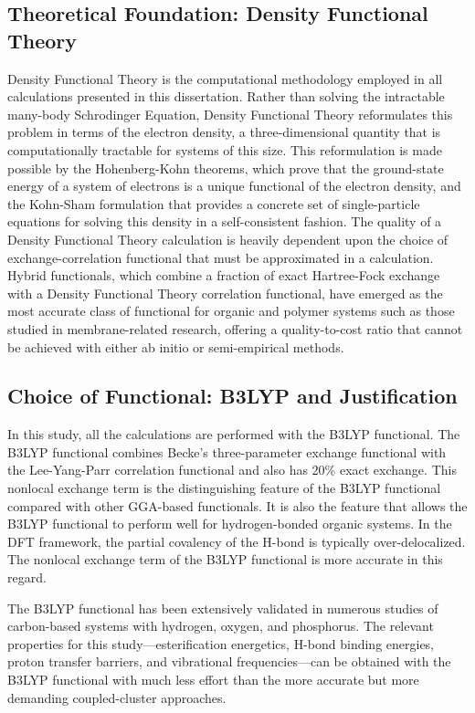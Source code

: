 \documentclass[12pt,a4paper]{report}
\begin{document}
\subsection{Theoretical Foundation: Density Functional Theory}
Density Functional Theory is the computational methodology employed in all calculations presented in this dissertation. Rather than solving the intractable many-body Schrodinger Equation, Density Functional Theory reformulates this problem in terms of the electron density, a three-dimensional quantity that is computationally tractable for systems of this size.\cite{72, 73} This reformulation is made possible by the Hohenberg-Kohn theorems, which prove that the ground-state energy of a system of electrons is a unique functional of the electron density, and the Kohn-Sham formulation that provides a concrete set of single-particle equations for solving this density in a self-consistent fashion.
The quality of a Density Functional Theory calculation is heavily dependent upon the choice of exchange-correlation functional that must be approximated in a calculation. Hybrid functionals, which combine a fraction of exact Hartree-Fock exchange with a Density Functional Theory correlation functional, have emerged as the most accurate class of functional for organic and polymer systems such as those studied in membrane-related research, offering a quality-to-cost ratio that cannot be achieved with either ab initio or semi-empirical methods.\cite{72, 73}

\subsection{Choice of Functional: B3LYP and Justification}
In this study, all the calculations are performed with the B3LYP functional. The B3LYP functional combines Becke's three-parameter exchange functional\cite{72} with the Lee-Yang-Parr correlation functional\cite{73} and also has 20\% exact exchange. This nonlocal exchange term is the distinguishing feature of the B3LYP functional compared with other GGA-based functionals. It is also the feature that allows the B3LYP functional to perform well for hydrogen-bonded organic systems. In the DFT framework, the partial covalency of the H-bond is typically over-delocalized. The nonlocal exchange term of the B3LYP functional is more accurate in this regard.

The B3LYP functional has been extensively validated in numerous studies of carbon-based systems with hydrogen, oxygen, and phosphorus.\cite{72,73} The relevant properties for this study—esterification energetics, H-bond binding energies, proton transfer barriers, and vibrational frequencies—can be obtained with the B3LYP functional with much less effort than the more accurate but more demanding coupled-cluster approaches.
\end{document}

